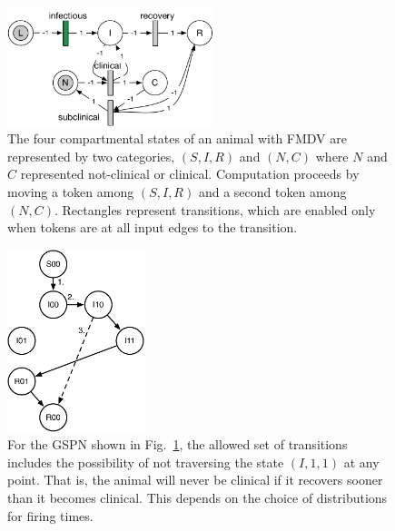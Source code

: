 \documentclass{article}
\begin{document}
\begin{figure}
\centerline{\includegraphics[width=6cm]{individual_gspn}}
\caption{The four compartmental states of an animal with FMDV
are represented by two categories, $(S,I,R)$ and $(N,C)$
where $N$ and $C$ represented not-clinical or clinical.
Computation proceeds by moving a token among $(S,I,R)$ and a
second token among $(N,C)$. Rectangles represent transitions,
which are enabled only when tokens are at all input edges to the
transition.\label{fig:individual_gspn}}
\end{figure}
\begin{figure}
\centerline{\includegraphics[width=4cm]{state_space_dependent}}
\caption{For the GSPN shown in Fig.~\ref{fig:individual_gspn},
the allowed set of transitions includes the possibility
of not traversing the state $(I,1,1)$ at any point. That is,
the animal will never be clinical if it recovers sooner
than it becomes clinical. This depends on the choice of
distributions for firing times.\label{fig:state_space_dependent}}
\end{figure}
\end{document}
